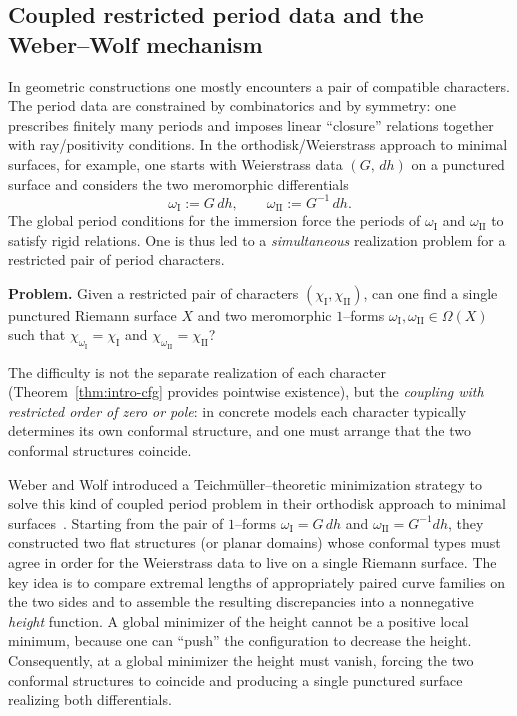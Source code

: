 \documentclass[a4paper,12pt]{amsart}
\newcommand{\Om}{\Omega}
\theoremstyle{plain}
\theoremstyle{definition}
\begin{document}
\subsection{Coupled restricted period data and the Weber--Wolf mechanism}\label{subsec:coupled}
In geometric constructions one mostly encounters a pair of compatible characters. The period data are constrained by combinatorics and by symmetry: one prescribes finitely many periods and imposes linear
``closure'' relations together with ray/positivity conditions.
In the orthodisk/Weierstrass approach to minimal surfaces, for example, one starts with Weierstrass data $(G,\, dh)$ on a
punctured surface and considers the two meromorphic differentials
\[
\omega_{\mathrm{I}} := G\, dh,\qquad \omega_{\mathrm{II}} := G^{-1}\,dh .
\]
The global period conditions for the immersion force the periods of $\omega_{\mathrm{I}}$ and $\omega_{\mathrm{II}}$ to satisfy rigid relations.
One is thus led to a \emph{simultaneous} realization problem for a restricted pair of period characters.

\medskip
\noindent\textbf{Problem.}\; Given a restricted pair of characters $(\chi_{\mathrm{I}},\chi_{\mathrm{II}})$, can one find a single punctured Riemann
surface $X$ and two meromorphic $1$--forms $\omega_{\mathrm{I}},\omega_{\mathrm{II}}\in\Om(X)$ such that
$\chi_{\omega_{\mathrm{I}}}=\chi_{\mathrm{I}}$ and $\chi_{\omega_{\mathrm{II}}}=\chi_{\mathrm{II}}$?
\medskip

The difficulty is not the separate realization of each character (Theorem~\ref{thm:intro-cfg} provides pointwise existence), but the
\emph{coupling with restricted order of zero or pole}: in concrete models each character typically determines its own conformal structure, and one must arrange that the two
conformal structures coincide.

Weber and Wolf introduced a Teichm\"uller--theoretic minimization strategy to solve this kind of coupled period problem in their orthodisk
approach to minimal surfaces~\cite{WeberWolfGAFA,WeberWolfAnnals}.
Starting from the pair of $1$--forms $\omega_{\mathrm{I}}=G\,dh$ and $\omega_{\mathrm{II}}=G^{-1}dh$, they constructed two  flat structures
(or planar domains) whose conformal types must agree in order for the Weierstrass data to live on a single Riemann surface.
The key idea is to compare extremal lengths of appropriately paired curve families on the two sides and to assemble the resulting  discrepancies into a nonnegative \emph{height} function.
A global minimizer of the height cannot be a positive local minimum, because one can ``push'' the configuration to decrease the height.
Consequently, at a global minimizer the height must vanish, forcing the two conformal structures to coincide and producing a single punctured
surface realizing both differentials.
\end{document}
